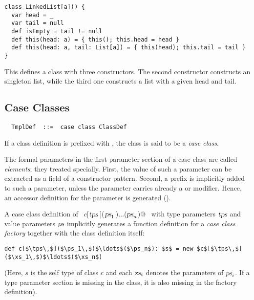 \begin{lstlisting}
class LinkedList[a]() {
  var head = _ 
  var tail = null 
  def isEmpty = tail != null   
  def this(head: a) = { this(); this.head = head }
  def this(head: a, tail: List[a]) = { this(head); this.tail = tail }
}
\end{lstlisting}
This defines a class  with three constructors.  The
second constructor constructs an singleton list, while the
third one constructs a list with a given head and tail.

\subsection{Case Classes}
\label{sec:case-classes}

\syntax\begin{lstlisting} 
  TmplDef  ::=  case class ClassDef
\end{lstlisting}

If a class definition is prefixed with , the class is said
to be a {\em case class}.  

The formal parameters in the first parameter section of a case class
are called {\em elements}; they treated
specially. First, the value of such a parameter can be extracted as a
field of a constructor pattern. Second, a  prefix is
implicitly added to such a parameter, unless the parameter carries
already a  or  modifier. Hence, an accessor
definition for the parameter is generated ().

A case class definition of ~\lstinline@$c$[$\mbox{\sl tps}\,$]($\mbox{\sl ps}_1\,$)$\ldots$($\mbox{\sl ps}_n$)@~ with type
parameters $\mbox{\sl tps}$ and value parameters $\mbox{\sl ps}$ implicitly
generates a function definition for a {\em case class factory}
together with the class definition itself:
\begin{lstlisting}
def c[$\tps\,$]($\ps_1\,$)$\ldots$($\ps_n$): $s$ = new $c$[$\tps\,$]($\xs_1\,$)$\ldots$($\xs_n$)
\end{lstlisting}
(Here, $s$ is the self type of class $c$ and each $\mbox{\sl xs}_i$ denotes the
parameters of $\mbox{\sl ps}_i$.  If a type parameter section is missing in the
class, it is also missing in the factory definition).

